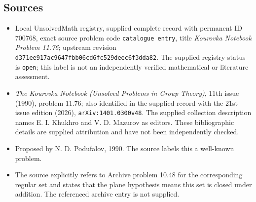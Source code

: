 \documentclass[11pt]{article}
\begin{document}
\subsection{Sources}
\begin{itemize}
\item Local UnsolvedMath registry, supplied complete record with permanent ID \(700768\), exact source problem code \texttt{catalogue entry}, title \emph{Kourovka Notebook Problem 11.76}; upstream revision \texttt{d371ee917ac9647fbb06cd6fc529deec6f3dda82}. The supplied registry status is \texttt{open}; this label is not an independently verified mathematical or literature assessment.
\item \emph{The Kourovka Notebook (Unsolved Problems in Group Theory)}, 11th issue (1990), problem 11.76; also identified in the supplied record with the 21st issue edition (2026), \texttt{arXiv:1401.0300v48}. The supplied collection description names E. I. Khukhro and V. D. Mazurov as editors. These bibliographic details are supplied attribution and have not been independently checked.
\item Proposed by N. D. Podufalov, 1990. The source labels this a well-known problem.
\item The source explicitly refers to Archive problem 10.48 for the corresponding regular set and states that the plane hypothesis means this set is closed under addition. The referenced archive entry is not supplied.
\end{itemize}
\end{document}
